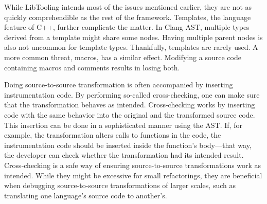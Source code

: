 While LibTooling intends most of the issues mentioned earlier, 
they are not as quickly comprehendible as the rest of the framework. 
Templates, the language feature of C++, further complicate the matter. 
In Clang AST, multiple types derived from a template might share some nodes. 
Having multiple parent nodes is also not uncommon for template types. 
Thankfully, templates are rarely used. 
A more common threat, macros, has a similar effect. 
Modifying a source code containing macros and comments results in 
losing both.

Doing source-to-source transformation is often accompanied by 
inserting instrumentation code. 
By performing so-called cross-checking, one can make sure that 
the transformation behaves as intended. 
Cross-checking works by inserting code with the same behavior 
into the original and the transformed source code.  
This insertion can be done in a sophisticated manner using the AST. 
If, for example, the transformation alters calls to functions 
in the code, the instrumentation code should be inserted inside the 
function's body—that way, the developer can check whether 
the transformation had its intended result.
Cross-checking is a safe way of ensuring source-to-source 
transformations work as intended. 
While they might be excessive for small refactorings, 
they are beneficial when debugging source-to-source 
transformations of larger scales, such as translating 
one language's source code to another's.
